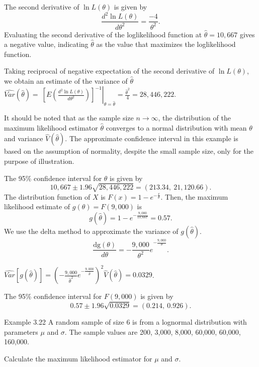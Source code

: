 \documentclass[]{book}
\theoremstyle{definition}
\theoremstyle{definition}
\theoremstyle{definition}
\theoremstyle{remark}
\begin{document}
The second derivative of \(\ln L \left( \theta \right)\) is given by
\[\frac{d^{2}\ln L\left( \theta \right)}{d\theta^{2}} = \frac{- 4}{\theta^{2}}.\]
Evaluating the second derivative of the loglikelihood function at
\(\hat{\theta} = 10,667\) gives a negative value, indicating
\(\hat{\theta}\) as the value that maximizes the loglikelihood function.

Taking reciprocal of negative expectation of the second derivative of
\(\ln L \left( \theta \right)\), we obtain an estimate of the variance
of \(\hat{\theta}\)
\(\widehat{Var}\left( \hat{\theta} \right) = \left. \ \left\lbrack E\left( \frac{d^{2}\ln L \left( \theta \right)}{d\theta^{2}} \right) \right\rbrack^{- 1} \right|_{\theta = \hat{\theta}} = \frac{{\hat{\theta}}^{2}}{4} = 28,446,222\).

It should be noted that as the sample size \(n \rightarrow \infty\), the
distribution of the maximum likelihood estimator \(\hat{\theta}\)
converges to a normal distribution with mean \(\theta\) and variance
\(\hat{V}\left( \hat{\theta} \right)\). The approximate confidence
interval in this example is based on the assumption of normality,
despite the small sample size, only for the purpose of illustration.

The 95\% confidence interval for \(\theta\) is given by
\[10,667 \pm 1.96\sqrt{28,446,222} = \left( 213.34,\ 21,120.66 \right).\]
The distribution function of \(X\) is
\(F\left( x \right) = 1 - e^{- \frac{x}{\theta}}\). Then, the maximum
likelihood estimate of
\(g\left( \theta \right) = F\left( 9,000 \right)\) is
\[g\left( \hat{\theta} \right) = 1 - e^{- \frac{9,000}{10,667}} = 0.57.\]
We use the delta method to approximate the variance of
\(g\left( \hat{\theta} \right)\).
\[\frac{\text{dg}\left( \theta \right)}{d \theta} = {- \frac{9,000}{\theta^{2}}e}^{- \frac{9,000}{\theta}}.\]

\(\widehat{Var}\left\lbrack g\left( \hat{\theta} \right) \right\rbrack = \left( - {\frac{9,000}{{\hat{\theta}}^{2}}e}^{- \frac{9,000}{\hat{\theta}}} \right)^{2}\hat{V}\left( \hat{\theta} \right) = 0.0329\).

The 95\% confidence interval for \(F\left( 9,000 \right)\) is given by
\[0.57 \pm 1.96\sqrt{0.0329} = \left( 0.214,\ 0.926 \right).\]

Example 3.22 A random sample of size 6 is from a lognormal distribution
with parameters \(\mu\) and \(\sigma\). The sample values are 200,
3,000, 8,000, 60,000, 60,000, 160,000.

Calculate the maximum likelihood estimator for \(\mu\) and \(\sigma\).
\end{document}
